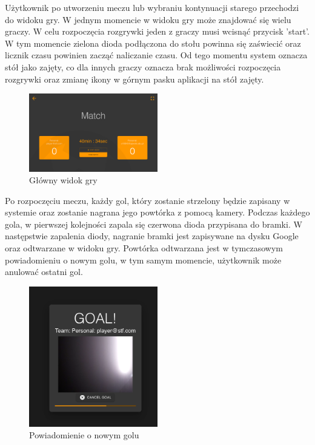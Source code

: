 Użytkownik po utworzeniu meczu lub wybraniu kontynuacji starego przechodzi do widoku gry. W jednym momencie w widoku gry może znajdować się wielu graczy. W celu rozpoczęcia rozgrywki jeden z graczy musi wcisnąć przycisk 'start'. W tym momencie zielona dioda podłączona do stołu powinna się zaświecić oraz licznik czasu powinien zacząć naliczanie czasu. Od tego momentu system oznacza stół jako zajęty, co dla innych graczy oznacza brak możliwości rozpoczęcia rozgrywki oraz zmianę ikony w górnym pasku aplikacji na stół zajęty.

\begin{figure}[h!]
  \centering
    \includegraphics[width=0.5\textwidth]{images/player/match.png}
  \caption{Główny widok gry}
  \label{fig:mobile}
\end{figure}

Po rozpoczęciu meczu, każdy gol, który zostanie strzelony będzie zapisany w systemie oraz zostanie nagrana jego powtórka z pomocą kamery. Podczas każdego gola, w pierwszej kolejności zapala się czerwona dioda przypisana do bramki. W następstwie zapalenia diody, nagranie bramki jest zapisywane na dysku Google oraz odtwarzane w widoku gry. Powtórka odtwarzana jest w tymczasowym powiadomieniu o nowym golu, w tym samym momencie, użytkownik może anulować ostatni gol.

\begin{figure}[h!]
  \centering
    \includegraphics[width=0.5\textwidth]{images/player/newgoal.png}
  \caption{Powiadomienie o nowym golu}
  \label{fig:mobile}
\end{figure}

